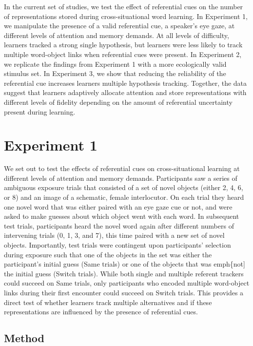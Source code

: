 \documentclass[12pt,]{article}
\begin{document}
In the current set of studies, we test the effect of referential cues on
the number of representations stored during cross-situational word
learning. In Experiment 1, we manipulate the presence of a valid
referential cue, a speaker's eye gaze, at different levels of attention
and memory demands. At all levels of difficulty, learners tracked a
strong single hypothesis, but learners were less likely to track
multiple word-object links when referential cues were present. In
Experiment 2, we replicate the findings from Experiment 1 with a more
ecologically valid stimulus set. In Experiment 3, we show that reducing
the reliability of the referential cue increases learners multiple
hypothesis tracking. Together, the data suggest that learners adaptively
allocate attention and store representations with different levels of
fidelity depending on the amount of referential uncertainty present
during learning.

\section{Experiment 1}\label{experiment-1}

We set out to test the effects of referential cues on cross-situational
learning at different levels of attention and memory demands.
Participants saw a series of ambiguous exposure trials that consisted of
a set of novel objects (either 2, 4, 6, or 8) and an image of a
schematic, female interlocutor. On each trial they heard one novel word
that was either paired with an eye gaze cue or not, and were asked to
make guesses about which object went with each word. In subsequent test
trials, participants heard the novel word again after different numbers
of intervening trials (0, 1, 3, and 7), this time paired with a new set
of novel objects. Importantly, test trials were contingent upon
participants' selection during exposure such that one of the objects in
the set was either the participant's initial guess (Same trials) or one
of the objects that was emph\{not{]} the initial guess (Switch trials).
While both single and multiple referent trackers could succeed on Same
trials, only participants who encoded multiple word-object links during
their first encounter could succeed on Switch trials. This provides a
direct test of whether learners track multiple alternatives and if these
representations are influenced by the presence of referential cues.

\subsection{Method}\label{method}
\end{document}
